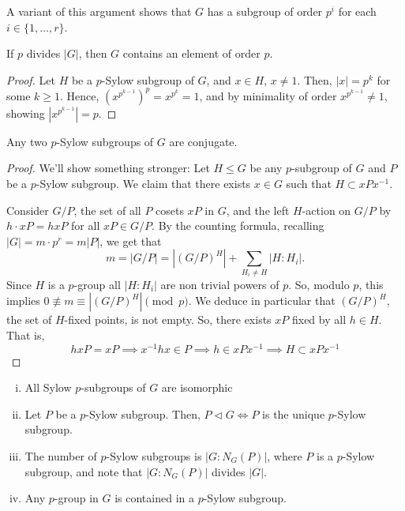 \begin{rmk}
    A variant of this argument shows that $G$ has a subgroup of order $p^i$ for each $i\in \{1,\dots,r\}$.
\end{rmk}

\begin{cor}
    If $p$ divides $|G|$, then $G$ contains an element of order $p$.
\end{cor}
\begin{proof}
    Let $H$ be a $p$-Sylow subgroup of $G$, and $x \in H$, $x \neq 1$. Then, $|x|=p^k$ for some $k \geq 1$. Hence, $(x^{p^{k-1}})^p=x^{p^k}=1$, and by minimality of order $x^{p^{k-1}}\neq 1$, showing $|x^{p^{k-1}}|=p$.
\end{proof}

\begin{thm}
    Any two $p$-Sylow subgroups of $G$ are conjugate.
\end{thm}

\begin{proof}
    We'll show something stronger: Let $H \leq G$ be any $p$-subgroup of $G$ and $P$ be a $p$-Sylow subgroup. We claim that there exists $x \in G$ such that $H \subset xPx^{-1}$.

    Consider $G/P$, the set of all $P$ cosets $xP$ in $G$, and the left $H$-action on $G/P$ by $h \cdot xP=hxP$ for all $xP \in G/P$. By the counting formula, recalling $|G|=m\cdot p^r=m|P|$, we get that
    $$m = |G/P|=|(G/P)^H|+\sum_{H_i \neq H} |H:H_i|.$$
    Since $H$ is a $p$-group all $|H:H_i|$ are non trivial powers of $p$. So, modulo $p$, this implies $0 \not \equiv m \equiv |(G/P)^H| \pmod p$. We deduce in particular that $(G/P)^H$, the set of $H$-fixed points, is not empty. So, there exists $xP$ fixed by all $h \in H$. That is,
    $$hxP=xP\implies x^{-1}hx \in P \implies h \in xPx^{-1} \implies H \subset xPx^{-1}$$
\end{proof}

\begin{cor}
    \begin{enumerate}[(i)]
        \item All Sylow $p$-subgroups of $G$ are isomorphic
        \item Let $P$ be a $p$-Sylow subgroup. Then, $P \lhd G \iff P$ is the unique $p$-Sylow subgroup.
        \item The number of $p$-Sylow subgroups is $|G:N_G(P)|$, where $P$ is a $p$-Sylow subgroup, and note that $|G:N_G(P)|$ divides $|G|$.
        \item Any $p$-group in $G$ is contained in a $p$-Sylow subgroup.
    \end{enumerate}
\end{cor}

